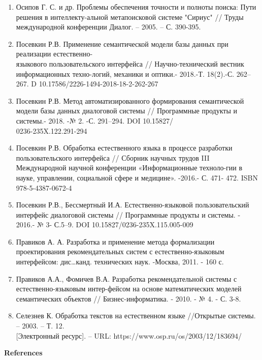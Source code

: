 \begin{noparindent}
\begin{enumerate}
\item
  Осипов Г. С. и др. Проблемы обеспечения точности и полноты поиска:
  Пути решения в интеллекту-альной метапоисковой системе "Сириус" //
  Труды международной конференции Диалог. -- 2005. -- С. 390-395.
\item
  Посевкин Р.В. Применение семантической модели базы данных при
  реализации естественно-\\языкового пользовательского интерфейса //
  Научно-технический вестник информационных техно-логий, механики и
  оптики.- 2018.-Т. 18(2).-С. 262--267.
  D 10.17586/2226-1494-2018-18-2-262-267
\item
  Посевкин Р.В. Метод автоматизированного формирования семантической
  модели базы данных диалоговой системы // Программные продукты и
  системы.- 2018. -№ 2. -С. 291--294. DOI 10.15827/\\0236-235X.122.291-294
\item
  Посевкин Р.В. Обработка естественного языка в процессе разработки
  пользовательского интерфейса // Сборник научных трудов III
  Международной научной конференции «Информационные техноло-гии в науке,
  управлении, социальной сфере и медицине». -2016.- С. 471- 472. ISBN
  978-5-4387-0672-4
\item
  Посевкин Р.В., Бессмертный И.А. Естественно-языковой пользовательский
  интерфейс диалоговой системы // Программные продукты и системы. -
  2016.- № 3- С.5--9. DOI 10.15827/0236-235X.115.005-009
\item
  Правиков А. А. Разработка и применение метода формализации
  проектирования рекомендательных систем с естественно-языковым
  интерфейсом: дис\ldots канд. технических наук. -Москва, 2011. - 160 с.
\item
  Правиков А.А., Фомичев В.А. Разработка рекомендательной системы с
  естественно-языковым интер-фейсом на основе математических моделей
  семантических объектов // Бизнес-информатика. - 2010. - № 4. - С. 3-8.
\item
  Селезнев К. Обработка текстов на естественном языке //Открытые
  системы. -- 2003. -- Т. 12. \\{[}Электронный ресурс{]}. -- URL:
  https://www.osp.ru/os/2003/12/183694/
\end{enumerate}
\end{noparindent}


\begin{center}
  {\bfseries References}
  \end{center}


